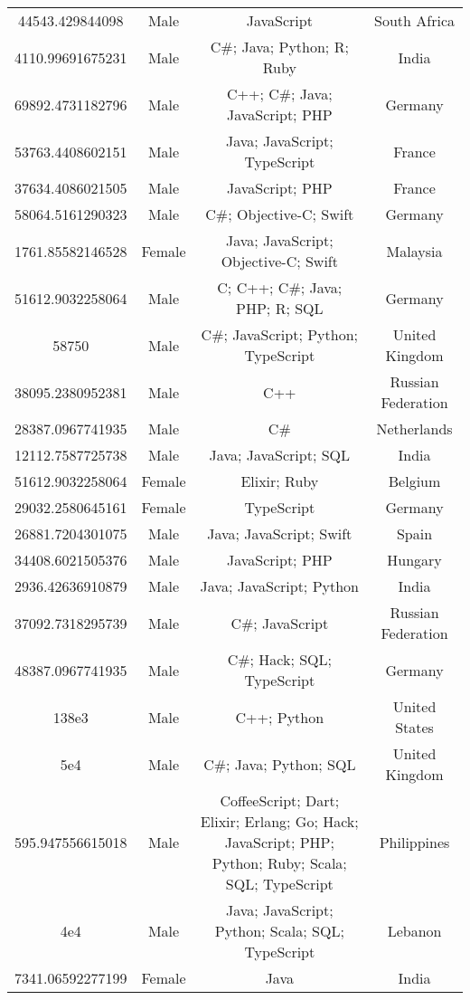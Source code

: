 \begin{center}
\begin{tabular}{ |c|c|c|c| }
44543.429844098  &  Male  &  JavaScript  &  South Africa  \\ 
4110.99691675231  &  Male  &  C\#; Java; Python; R; Ruby  &  India  \\ 
69892.4731182796  &  Male  &  C++; C\#; Java; JavaScript; PHP  &  Germany  \\ 
53763.4408602151  &  Male  &  Java; JavaScript; TypeScript  &  France  \\ 
37634.4086021505  &  Male  &  JavaScript; PHP  &  France  \\ 
58064.5161290323  &  Male  &  C\#; Objective-C; Swift  &  Germany  \\ 
1761.85582146528  &  Female  &  Java; JavaScript; Objective-C; Swift  &  Malaysia  \\ 
51612.9032258064  &  Male  &  C; C++; C\#; Java; PHP; R; SQL  &  Germany  \\ 
58750  &  Male  &  C\#; JavaScript; Python; TypeScript  &  United Kingdom  \\ 
38095.2380952381  &  Male  &  C++  &  Russian Federation  \\ 
28387.0967741935  &  Male  &  C\#  &  Netherlands  \\ 
12112.7587725738  &  Male  &  Java; JavaScript; SQL  &  India  \\ 
51612.9032258064  &  Female  &  Elixir; Ruby  &  Belgium  \\ 
29032.2580645161  &  Female  &  TypeScript  &  Germany  \\ 
26881.7204301075  &  Male  &  Java; JavaScript; Swift  &  Spain  \\ 
34408.6021505376  &  Male  &  JavaScript; PHP  &  Hungary  \\ 
2936.42636910879  &  Male  &  Java; JavaScript; Python  &  India  \\ 
37092.7318295739  &  Male  &  C\#; JavaScript  &  Russian Federation  \\ 
48387.0967741935  &  Male  &  C\#; Hack; SQL; TypeScript  &  Germany  \\ 
138e3  &  Male  &  C++; Python  &  United States  \\ 
5e4  &  Male  &  C\#; Java; Python; SQL  &  United Kingdom  \\ 
595.947556615018  &  Male  &  CoffeeScript; Dart; Elixir; Erlang; Go; Hack; JavaScript; PHP; Python; Ruby; Scala; SQL; TypeScript  &  Philippines  \\ 
4e4  &  Male  &  Java; JavaScript; Python; Scala; SQL; TypeScript  &  Lebanon  \\ 
7341.06592277199  &  Female  &  Java  &  India  \\ 

\end{tabular}
\end{center}
